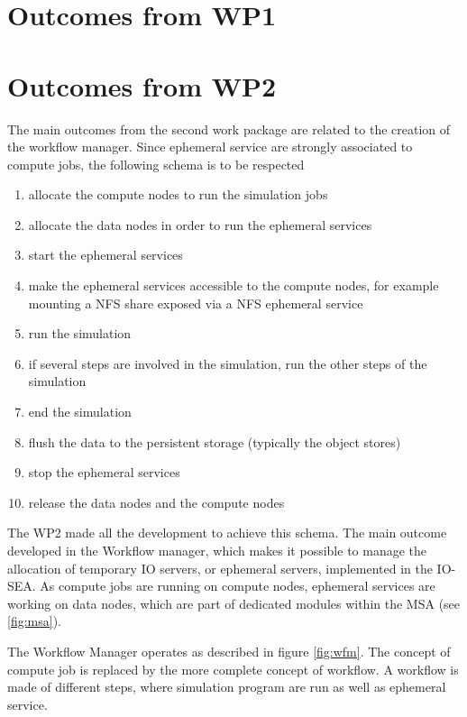 \section{Outcomes from WP1}

\section{Outcomes from WP2}

The main outcomes from the second work package are related to the creation of the workflow manager. Since
ephemeral service are strongly associated to compute jobs, the following schema is to be respected
\begin{enumerate}
    \item allocate the compute nodes to run the simulation jobs
    \item allocate the data nodes in order to run the ephemeral services
    \item start the ephemeral services
    \item make the ephemeral services accessible to the compute nodes, for example mounting a NFS share
    exposed via a NFS ephemeral service
    \item run the simulation
    \item if several steps are involved in the simulation, run the other steps of the simulation
    \item end the simulation
    \item flush the data to the persistent storage (typically the object stores)
    \item stop the ephemeral services
    \item release the data nodes and the compute nodes
\end{enumerate}

The WP2 made all the development to achieve this schema. The main outcome developed in the Workflow manager,
which makes it possible to manage the allocation of temporary IO servers, or ephemeral servers, implemented in 
the IO-SEA. As compute jobs are running on compute nodes, ephemeral services are working on data nodes, which
are part of dedicated modules within the MSA (see \ref{fig:msa}). 

The Workflow Manager operates as described in figure \ref{fig:wfm}. The concept of compute job is replaced by
the more complete concept of workflow. A workflow is made of different steps, where simulation program are run
as well as ephemeral service. 

